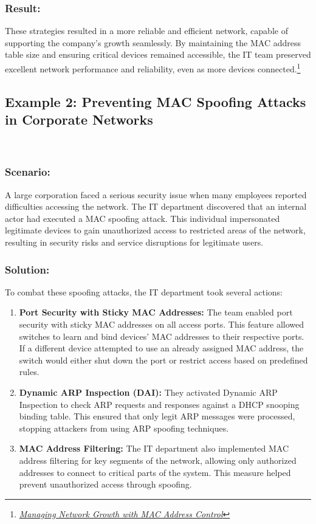 \documentclass[11pt,a4paper]{article}
\begin{document}
\subsubsection*{Result:}
These strategies resulted in a more reliable and efficient network, capable of supporting the company’s growth seamlessly. By maintaining the MAC address table size and ensuring critical devices remained accessible, the IT team preserved excellent network performance and reliability, even as more devices connected.\footnote{\href{https://orhanergun.net/case-studies-network-management-insights}{\textit{Managing Network Growth with MAC Address Control}}}

\subsection*{Example 2: Preventing MAC Spoofing Attacks in Corporate Networks}

\
\subsubsection*{Scenario:}
A large corporation faced a serious security issue when many employees reported difficulties accessing the network. The IT department discovered that an internal actor had executed a MAC spoofing attack. This individual impersonated legitimate devices to gain unauthorized access to restricted areas of the network, resulting in security risks and service disruptions for legitimate users.

\subsubsection*{Solution:}
To combat these spoofing attacks, the IT department took several actions:

\begin{enumerate}
    \item \textbf{Port Security with Sticky MAC Addresses:} The team enabled port security with sticky MAC addresses on all access ports. This feature allowed switches to learn and bind devices' MAC addresses to their respective ports. If a different device attempted to use an already assigned MAC address, the switch would either shut down the port or restrict access based on predefined rules.
    \item \textbf{Dynamic ARP Inspection (DAI):} They activated Dynamic ARP Inspection to check ARP requests and responses against a DHCP snooping binding table. This ensured that only legit ARP messages were processed, stopping attackers from using ARP spoofing techniques.
    \item \textbf{MAC Address Filtering:} The IT department also implemented MAC address filtering for key segments of the network, allowing only authorized addresses to connect to critical parts of the system. This measure helped prevent unauthorized access through spoofing.
\end{enumerate}
\end{document}
